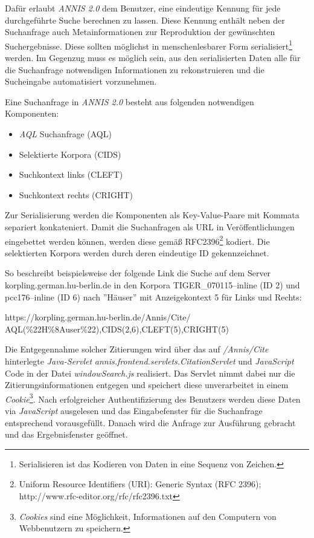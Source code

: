 Dafür erlaubt \emph{ANNIS 2.0} dem Benutzer, eine eindeutige Kennung für jede durchgeführte Suche berechnen zu lassen. Diese Kennung enthält neben der Suchanfrage auch Metainformationen zur Reproduktion der gewünschten Suchergebnisse. Diese sollten möglichst in menschenlesbarer Form serialisiert\footnote{Serialisieren ist das Kodieren von Daten in eine Sequenz von Zeichen.} werden. Im Gegenzug muss es möglich sein, aus den serialisierten Daten alle für die Suchanfrage notwendigen Informationen zu rekonstruieren und die Sucheingabe automatisiert vorzunehmen.

Eine Suchanfrage in \emph{ANNIS 2.0} besteht aus folgenden notwendigen Komponenten:

\begin{itemize}
	\item{\emph{AQL} Suchanfrage (AQL)}
	\item{Selektierte Korpora (CIDS)}
	\item{Suchkontext links (CLEFT)}
	\item{Suchkontext rechts (CRIGHT)}
\end{itemize}

Zur Serialisierung werden die Komponenten als Key-Value-Paare mit Kommata separiert konkateniert. Damit die Suchanfragen als URL in Veröffentlichungen eingebettet werden können, werden diese gemäß RFC2396\footnote{Uniform Resource Identifiers (URI): Generic Syntax (RFC 2396); http://www.rfc-editor.org/rfc/rfc2396.txt} kodiert. Die selektierten Korpora werden durch deren eindeutige ID gekennzeichnet.

So beschreibt beispielsweise der folgende Link die Suche auf dem Server\\  korpling.german.hu-berlin.de in den Korpora TIGER\_070115--inline (ID 2) und\\ pcc176--inline (ID 6) nach ''Häuser'' mit Anzeigekontext 5 für Links und Rechts:

\begin{center}
https://korpling.german.hu-berlin.de/Annis/Cite/\\AQL(\%22H\%8Auser\%22),CIDS(2,6),CLEFT(5),CRIGHT(5)
\end{center}

Die Entgegennahme solcher Zitierungen wird über das auf \emph{/Annis/Cite} hinterlegte \emph{Java-Servlet} \emph{annis.frontend.servlets.CitationServlet} und \emph{JavaScript} Code in der Datei
\emph{windowSearch.js} realisiert. Das Servlet nimmt dabei nur die Zitierungsinformationen entgegen und speichert diese unverarbeitet in einem \emph{Cookie}\footnote{\emph{Cookies} sind eine Möglichkeit, Informationen auf den Computern von Webbenutzern zu speichern.}. Nach erfolgreicher Authentifizierung des Benutzers werden diese Daten via \emph{JavaScript} ausgelesen und das Eingabefenster für die Suchanfrage entsprechend vorausgefüllt. Danach wird die Anfrage zur Ausführung gebracht und das Ergebnisfenster geöffnet.

